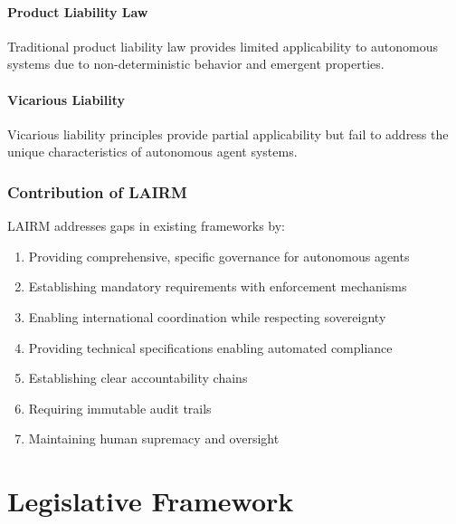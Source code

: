\documentclass[12pt,a4paper,twoside,openright]{book}
\begin{document}
\subsection{Product Liability Law}

Traditional product liability law provides limited applicability to autonomous systems due to non-deterministic behavior and emergent properties.

\subsection{Vicarious Liability}

Vicarious liability principles provide partial applicability but fail to address the unique characteristics of autonomous agent systems.

\section{Contribution of LAIRM}

LAIRM addresses gaps in existing frameworks by:

\begin{enumerate}
    \item Providing comprehensive, specific governance for autonomous agents
    \item Establishing mandatory requirements with enforcement mechanisms
    \item Enabling international coordination while respecting sovereignty
    \item Providing technical specifications enabling automated compliance
    \item Establishing clear accountability chains
    \item Requiring immutable audit trails
    \item Maintaining human supremacy and oversight
\end{enumerate}

\part{Legislative Framework}










\end{document}
